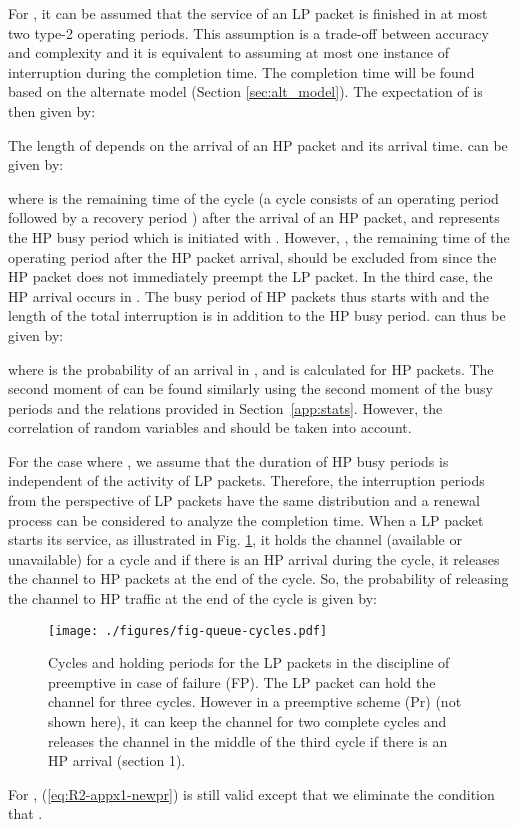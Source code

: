 \documentclass[11pt,journal,oneside,onecolumn,draftclsnofoot]{IEEEtran}
\begin{document}
For , it can be assumed that the service of an LP packet is finished in at most two type-2 operating periods. This assumption is a trade-off between accuracy and complexity and it is  equivalent to assuming at most one instance of  interruption during the completion time. The completion time will be found based on the alternate model (Section \ref{sec:alt_model}). The expectation of  is then given by:

The length of  depends on the arrival of an HP packet and its arrival time. 
 can be given by:

where  is the remaining time of the cycle (a cycle consists of an operating period  followed by a recovery period ) after the arrival of an HP packet, and  represents the HP busy period which is initiated with . However, , the remaining time of the operating period  after the HP packet arrival, should be excluded from  since the HP packet does not immediately preempt the LP packet. In the third case, the HP arrival occurs in . The busy period of HP packets thus starts with  and the length of the total interruption is  in addition to the HP busy period.  can thus be given by:

where  is the probability of an arrival in , and  is calculated for HP packets. The second moment of  can be found similarly using the second moment of the busy periods and the relations provided in Section~\ref{app:stats}. However, the correlation of random variables  and  should be taken into account. 

For the case where , we assume that the duration of HP busy periods is independent of the activity of LP packets. Therefore, the interruption periods from the perspective of LP packets have the same distribution and  a renewal process can be considered to analyze the completion time. When a LP packet starts its service, as illustrated in Fig. \ref{fig-queue-cycles}, it holds the channel (available or unavailable) for a cycle and if there is an HP arrival during the cycle, it releases the channel to HP packets at the end of the cycle. So, the probability of releasing the channel to HP traffic at the end of the cycle is given by:

\begin{figure}\texttt{[image: ./figures/fig-queue-cycles.pdf]}\caption{Cycles and holding periods for the LP packets in the discipline of preemptive in case of failure (FP). The LP packet can hold the channel for three cycles. However in a preemptive scheme (Pr) (not shown here), it can keep the channel for two complete cycles and releases the channel in the middle of the third cycle if there is an HP arrival (section 1). }
\label{fig-queue-cycles}\end{figure}
For , (\ref{eq:R2-appx1-newpr}) is still valid except that we eliminate the condition that .
\end{document}

